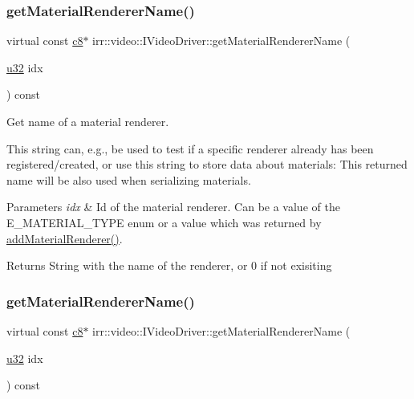 \subsubsection{\texorpdfstring{get\+Material\+Renderer\+Name()}{getMaterialRendererName()}\hspace{0.1cm}{\footnotesize\ttfamily [1/2]}}
{\footnotesize\ttfamily virtual const \hyperlink{namespaceirr_a9395eaea339bcb546b319e9c96bf7410}{c8}$\ast$ irr\+::video\+::\+I\+Video\+Driver\+::get\+Material\+Renderer\+Name (\begin{DoxyParamCaption}\item[{\hyperlink{namespaceirr_a0416a53257075833e7002efd0a18e804}{u32}}]{idx }\end{DoxyParamCaption}) const\hspace{0.3cm}{\ttfamily [pure virtual]}}



Get name of a material renderer. 

This string can, e.\+g., be used to test if a specific renderer already has been registered/created, or use this string to store data about materials\+: This returned name will be also used when serializing materials. 
\begin{DoxyParams}{Parameters}
{\em idx} & Id of the material renderer. Can be a value of the E\+\_\+\+M\+A\+T\+E\+R\+I\+A\+L\+\_\+\+T\+Y\+PE enum or a value which was returned by \hyperlink{classirr_1_1video_1_1IVideoDriver_a0dfc3a7168f3a73a6f4323b579f03ff6}{add\+Material\+Renderer()}. \\
\hline
\end{DoxyParams}
\begin{DoxyReturn}{Returns}
String with the name of the renderer, or 0 if not exisiting 
\end{DoxyReturn}
\mbox{\label{classirr_1_1video_1_1IVideoDriver_ac6f8c53abcd5a24d94c84185b0ef65e0}} 
\subsubsection{\texorpdfstring{get\+Material\+Renderer\+Name()}{getMaterialRendererName()}\hspace{0.1cm}{\footnotesize\ttfamily [2/2]}}
{\footnotesize\ttfamily virtual const \hyperlink{namespaceirr_a9395eaea339bcb546b319e9c96bf7410}{c8}$\ast$ irr\+::video\+::\+I\+Video\+Driver\+::get\+Material\+Renderer\+Name (\begin{DoxyParamCaption}\item[{\hyperlink{namespaceirr_a0416a53257075833e7002efd0a18e804}{u32}}]{idx }\end{DoxyParamCaption}) const\hspace{0.3cm}{\ttfamily [pure virtual]}}



